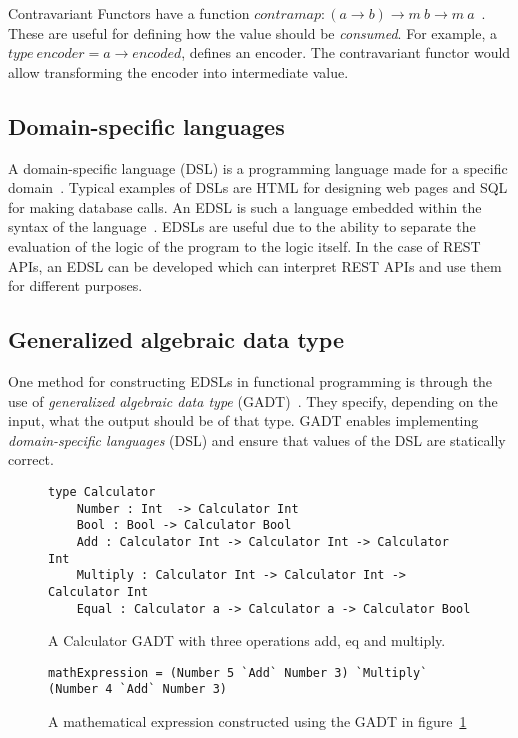 Contravariant Functors have a function $contramap : (a\rightarrow b) \rightarrow
m\ b \rightarrow m\ a$~\cite{bancerek2001miscellaneous}. These are useful for
defining how the value should be \textit{consumed}. For example, a $type\
encoder = a\rightarrow encoded$, defines an encoder. The contravariant functor
would allow transforming the encoder into intermediate value.

\subsection{Domain-specific languages}

A domain-specific language (DSL) is a programming language made for a specific
domain~\cite{elic2007systematic}. Typical examples of DSLs are HTML for
designing web pages and SQL for making database calls. An EDSL is such a
language embedded within the syntax of the language~\cite{hudak1996building}.
EDSLs are useful due to the ability to separate the evaluation of the logic of
the program to the logic itself. In the case of REST APIs, an EDSL can be
developed which can interpret REST APIs and use them for different purposes. 

\subsection{Generalized algebraic data type}\label{gadt}

One method for constructing EDSLs in functional programming is through the use
of \textit{generalized algebraic data type} (GADT)~\cite{cheney2003first}.
They specify, depending on the input, what the output should be of that type.
GADT enables implementing \textit{domain-specific languages} (DSL) and ensure
that values of the DSL are statically correct. 

\begin{figure}[H]
    \begin{lstlisting}
type Calculator 
    Number : Int  -> Calculator Int
    Bool : Bool -> Calculator Bool
    Add : Calculator Int -> Calculator Int -> Calculator Int
    Multiply : Calculator Int -> Calculator Int -> Calculator Int
    Equal : Calculator a -> Calculator a -> Calculator Bool
    \end{lstlisting}
    \caption{A Calculator GADT with three operations add, eq and multiply.}
    \label{gadtcalculator}
\end{figure}

\begin{figure}[H]
    \begin{lstlisting}
mathExpression = (Number 5 `Add` Number 3) `Multiply` (Number 4 `Add` Number 3)
    \end{lstlisting}
    \caption{A mathematical expression constructed using the GADT in
    figure~\ref{gadtcalculator}}
    \label{mathexpressiongadt}
\end{figure}


